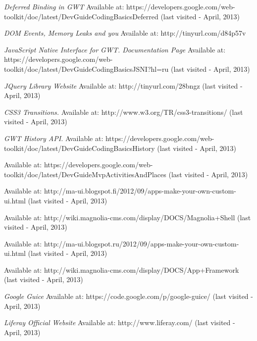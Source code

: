 \begin{thebibliography}{9}
\emph{Deferred Binding in GWT} 
Available at: https://developers.google.com/web-toolkit/doc/latest/DevGuideCodingBasicsDeferred (last visited - April, 2013)

\emph{DOM Events, Memory Leaks and you} 
Available at: http://tinyurl.com/d84p57v 
  
\emph{JavaScript Native Interface for GWT. Documentation Page} 
Available at: https://developers.google.com/web-toolkit/doc/latest/DevGuideCodingBasicsJSNI?hl=ru (last visited - April, 2013)

\emph{JQuery Library Website} 
Available at: http://tinyurl.com/28bngz (last visited - April, 2013)

\emph{CSS3 Transitions.} 
Available at: http://www.w3.org/TR/css3-transitions/ (last visited - April, 2013)

\emph{GWT History API.} 
Available at: https://developers.google.com/web-toolkit/doc/latest/DevGuideCodingBasicsHistory (last visited - April, 2013)

Available at: https://developers.google.com/web-toolkit/doc/latest/DevGuideMvpActivitiesAndPlaces (last visited - April, 2013)

Available at: http://ma-ui.blogspot.fi/2012/09/apps-make-your-own-custom-ui.html (last visited - April, 2013)

Available at: http://wiki.magnolia-cms.com/display/DOCS/Magnolia+Shell (last visited - April, 2013)

Available at: http://ma-ui.blogspot.ru/2012/09/apps-make-your-own-custom-ui.html (last visited - April, 2013)

Available at: http://wiki.magnolia-cms.com/display/DOCS/App+Framework (last visited - April, 2013)

\emph{Google Guice} 
Available at: https://code.google.com/p/google-guice/ (last visited - April, 2013)

%
\emph{Liferay Official Website}
Available at: http://www.liferay.com/ (last visited - April, 2013)


\end{thebibliography}